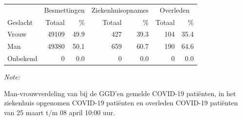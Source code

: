 \documentclass[
  english,
  man,floatsintext]{apa6}
\begin{document}
\begin{table}
\centering\begingroup\fontsize{11}{13}\selectfont

\begin{threeparttable}
\begin{tabular}{lrrrrrr}
\toprule
\multicolumn{1}{c}{ } & \multicolumn{2}{c}{Besmettingen} & \multicolumn{2}{c}{Ziekenhuisopnames} & \multicolumn{2}{c}{Overleden} \\
\cmidrule(l{3pt}r{3pt}){2-3} \cmidrule(l{3pt}r{3pt}){4-5} \cmidrule(l{3pt}r{3pt}){6-7}
Geslacht & Totaal & \% & Totaal & \% & Totaal & \%\\
\midrule
Vrouw & 49109 & 49.9 & 427 & 39.3 & 104 & 35.4\\
Man & 49380 & 50.1 & 659 & 60.7 & 190 & 64.6\\
Onbekend & 0 & 0.0 & 0 & 0.0 & 0 & 0.0\\
\bottomrule
\end{tabular}
\begin{tablenotes}
\item \textit{Note: } 
\item Man-vrouwverdeling van bij de GGD’en gemelde COVID-19 patiënten, in het ziekenhuis opgenomen COVID-19 patiënten en overleden COVID-19 patiënten van 25 maart t/m 08 april 10:00 uur.
\end{tablenotes}
\end{threeparttable}
\endgroup{}
\end{table}
\newpage
\end{document}

